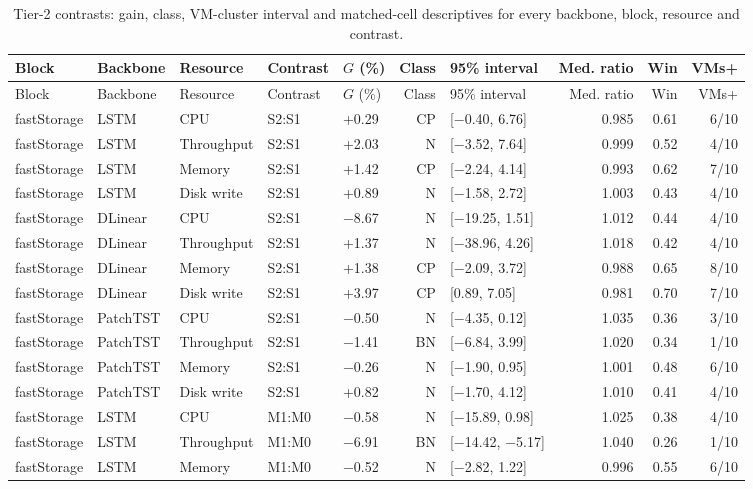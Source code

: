 \footnotesize
\setlength{\tabcolsep}{3pt}
\begin{longtable}{@{}lllllrlrrr@{}}
\caption{Tier-2 contrasts: gain, class, VM-cluster interval and matched-cell descriptives for every backbone, block, resource and contrast.}\label{tab:supp-t2-contrasts}\\
\toprule
Block & Backbone & Resource & Contrast & $G$ (\%) & Class & 95\% interval & Med. ratio & Win & VMs+ \\
\midrule
\endfirsthead
\toprule
Block & Backbone & Resource & Contrast & $G$ (\%) & Class & 95\% interval & Med. ratio & Win & VMs+ \\
\midrule
\endhead
\bottomrule
\endfoot
fastStorage & LSTM & CPU & S2:S1 & +0.29 & CP & [$-$0.40, 6.76] & 0.985 & 0.61 & 6/10 \\
fastStorage & LSTM & Throughput & S2:S1 & +2.03 & N & [$-$3.52, 7.64] & 0.999 & 0.52 & 4/10 \\
fastStorage & LSTM & Memory & S2:S1 & +1.42 & CP & [$-$2.24, 4.14] & 0.993 & 0.62 & 7/10 \\
fastStorage & LSTM & Disk write & S2:S1 & +0.89 & N & [$-$1.58, 2.72] & 1.003 & 0.43 & 4/10 \\
fastStorage & DLinear & CPU & S2:S1 & $-$8.67 & N & [$-$19.25, 1.51] & 1.012 & 0.44 & 4/10 \\
fastStorage & DLinear & Throughput & S2:S1 & +1.37 & N & [$-$38.96, 4.26] & 1.018 & 0.42 & 4/10 \\
fastStorage & DLinear & Memory & S2:S1 & +1.38 & CP & [$-$2.09, 3.72] & 0.988 & 0.65 & 8/10 \\
fastStorage & DLinear & Disk write & S2:S1 & +3.97 & CP & [0.89, 7.05] & 0.981 & 0.70 & 7/10 \\
fastStorage & PatchTST & CPU & S2:S1 & $-$0.50 & N & [$-$4.35, 0.12] & 1.035 & 0.36 & 3/10 \\
fastStorage & PatchTST & Throughput & S2:S1 & $-$1.41 & BN & [$-$6.84, 3.99] & 1.020 & 0.34 & 1/10 \\
fastStorage & PatchTST & Memory & S2:S1 & $-$0.26 & N & [$-$1.90, 0.95] & 1.001 & 0.48 & 6/10 \\
fastStorage & PatchTST & Disk write & S2:S1 & +0.82 & N & [$-$1.70, 4.12] & 1.010 & 0.41 & 4/10 \\
fastStorage & LSTM & CPU & M1:M0 & $-$0.58 & N & [$-$15.89, 0.98] & 1.025 & 0.38 & 4/10 \\
fastStorage & LSTM & Throughput & M1:M0 & $-$6.91 & BN & [$-$14.42, $-$5.17] & 1.040 & 0.26 & 1/10 \\
fastStorage & LSTM & Memory & M1:M0 & $-$0.52 & N & [$-$2.82, 1.22] & 0.996 & 0.55 & 6/10 \\

\end{longtable}
